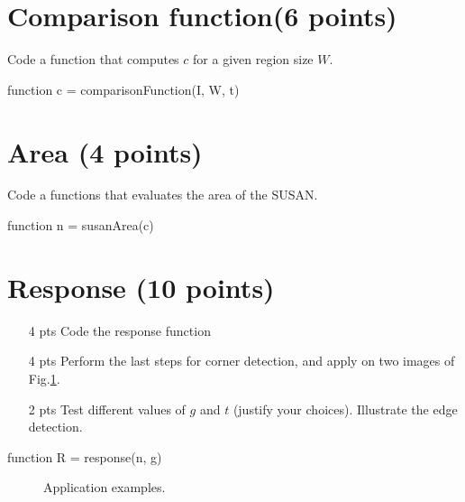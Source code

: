 \section{Comparison function(6 points)} 
\begin{qbox}
Code a function that computes $c$ for a given region size $W$.

\end{qbox}\begin{matlab}
function c = comparisonFunction(I, W, t)
\end{matlab}

\section{Area (4 points)}
\begin{qbox}
Code a functions that evaluates the area of the SUSAN.

\end{qbox}\begin{matlab}
function n = susanArea(c)
\end{matlab}

\section{Response (10 points)}
\begin{qbox}

\begin{itemize}
 \item[4 pts]
Code the response function

\item [4 pts]
Perform the last steps for corner detection, and apply on two images of Fig.\ref{fig:exam:2018:retake:ipr:examples}. 
\item [2 pts] Test different values of $g$ and  $t$ (justify your choices). Illustrate the edge detection.
\end{itemize}



\end{qbox}\begin{matlab}
function R = response(n, g)
\end{matlab}

\begin{figure}
 \centering
 \hfill
 \caption{Application examples.}
 \label{fig:exam:2018:retake:ipr:examples}
\end{figure}

